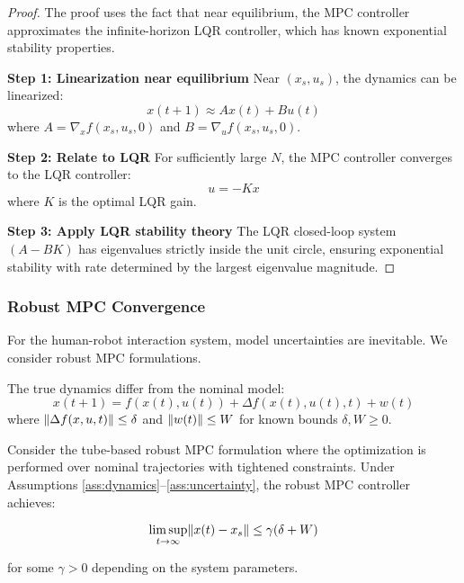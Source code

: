 \begin{proof}
The proof uses the fact that near equilibrium, the MPC controller approximates the infinite-horizon LQR controller, which has known exponential stability properties.

\textbf{Step 1: Linearization near equilibrium}
Near $(x_s, u_s)$, the dynamics can be linearized:
$$x(t+1) \approx A x(t) + B u(t)$$
where $A = \nabla_x f(x_s, u_s, 0)$ and $B = \nabla_u f(x_s, u_s, 0)$.

\textbf{Step 2: Relate to LQR}
For sufficiently large $N$, the MPC controller converges to the LQR controller:
$$u = -K x$$
where $K$ is the optimal LQR gain.

\textbf{Step 3: Apply LQR stability theory}
The LQR closed-loop system $(A - BK)$ has eigenvalues strictly inside the unit circle, ensuring exponential stability with rate determined by the largest eigenvalue magnitude.
\end{proof}

\subsubsection{Robust MPC Convergence}

For the human-robot interaction system, model uncertainties are inevitable. We consider robust MPC formulations.

\begin{assumption}
\label{ass:uncertainty}
The true dynamics differ from the nominal model:
$$x(t+1) = f(x(t), u(t)) + \Delta f(x(t), u(t), t) + w(t)$$
where $\lVert\Delta f(x, u, t)\rVert \leq \delta$ and $\lVert w(t)\rVert \leq W$ for known bounds $\delta, W \geq 0$.
\end{assumption}

\begin{theorem}
\label{thm:robust_mpc}
Consider the tube-based robust MPC formulation where the optimization is performed over nominal trajectories with tightened constraints. Under Assumptions \ref{ass:dynamics}--\ref{ass:uncertainty}, the robust MPC controller achieves:

$$\limsup_{t \to \infty} \lVert x(t) - x_s\rVert \leq \gamma(\delta + W)$$

for some $\gamma > 0$ depending on the system parameters.
\end{theorem}

